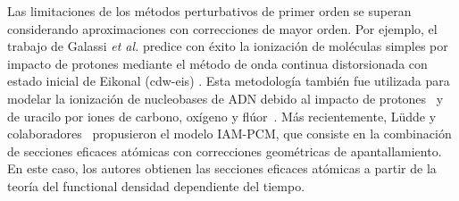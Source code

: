Las limitaciones de los métodos perturbativos de primer orden se superan 
considerando aproximaciones con correcciones de mayor orden. 
Por ejemplo, el trabajo de Galassi \textit{et al.} \cite{Galassi:00} 
predice con éxito la ionización de moléculas simples por impacto de 
protones mediante el método de onda continua distorsionada con estado 
inicial de Eikonal (\acs{cdw-eis}) \cite{Fainstein:88,Miraglia:08,
Miraglia:09}. Esta metodología también fue utilizada para modelar 
la ionización de nucleobases de ADN debido al impacto de 
protones~\cite{Galassi:12} y de uracilo por iones de carbono, oxígeno y 
flúor~\cite{champion2012,agnihotri2012,agnihotri2013}.
Más recientemente, L\"udde y colaboradores~\cite{Ludde:16,Ludde:18,
Ludde:19,Ludde:20} propusieron el modelo IAM-PCM, que consiste en la 
combinación de secciones eficaces atómicas con correcciones geométricas 
de apantallamiento. En este caso, los autores obtienen las secciones 
eficaces atómicas a partir de la teoría del functional densidad 
dependiente del tiempo. 

